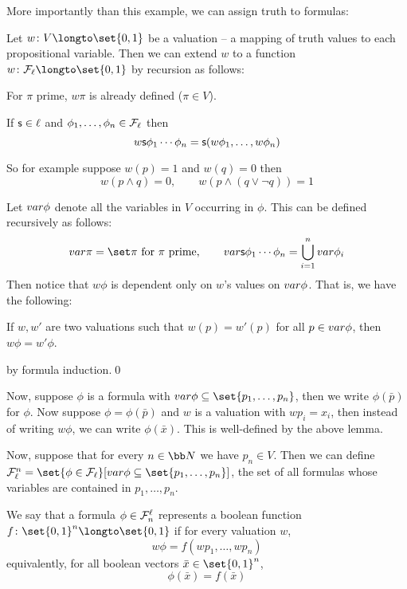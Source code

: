 More importantly than this example, we can assign truth to formulas:

\bdefn

    Let $w\colon V\longto\set{0,1}$ be a {\emphcolor valuation} -- a mapping of truth values to
    each propositional variable.
    Then we can extend $w$ to a function $w\colon{\cal F}_\ell\longto\set{0,1}$ by recursion as
    follows:
    \benum
        \item For $\pi$ prime, $w\pi$ is already defined ($\pi\in V$).
        \item If ${\sf s}\in\ell$ and $\phi_1,\dots,\phi_n\in{\cal F}_\ell$ then
        $$ w{\sf s}\phi_1\cdots\phi_n = {\sf s}(w\phi_1,\dots,w\phi_n) $$
    \eenum

\edefn

So for example suppose $w(p)=1$ and $w(q)=0$ then
$$ w(p\land q) = 0,\qquad w(p\land(q\lor\neg q)) = 1 $$

Let ${\sl var}\phi$ denote all the variables in $V$ occurring in $\phi$.
This can be defined recursively as follows:
$$ \var\pi=\set\pi\hbox{ for $\pi$ prime},\qquad
\var\s s\phi_1\cdots\phi_n = \bigcup_{i=1}^n\var\phi_i $$
Then notice that $w\phi$ is dependent only on $w$'s values on ${\sl var}\phi$.
That is, we have the following:

\blemm

    If $w,w'$ are two valuations such that $w(p)=w'(p)$ for all $p\in{\sl var}\phi$, then
    $w\phi=w'\phi$.

\elemm

\Proof by formula induction.\qed

Now, suppose $\phi$ is a formula with $\var\phi\subseteq\set{p_1,\dots,p_n}$, then we write
$\phi(\bar p)$ for $\phi$.
Now suppose $\phi=\phi(\bar p)$ and $w$ is a valuation with $wp_i=x_i$, then instead of writing
$w\phi$, we can write $\phi(\bar x)$.
This is well-defined by the above lemma.

Now, suppose that for every $n\in{\bb N}$ we have $p_n\in V$.
Then we can define ${\cal F}^n_\ell=\set{\phi\in{\cal F}_\ell}[\var\phi\subseteq\set{p_1,\dots,p_n}]$,
the set of all formulas whose variables are contained in $p_1,\dots,p_n$.

\bdefn

    We say that a formula $\phi\in{\cal F}^\ell_n$ {\emphcolor represents} a boolean function
    $f\colon\set{0,1}^n\longto\set{0,1}$ if for every valuation $w$,
    $$ w\phi = f(wp_1,\dots,wp_n) $$
    equivalently, for all boolean vectors $\bar x\in\set{0,1}^n$,
    $$ \phi(\bar x) = f(\bar x) $$

